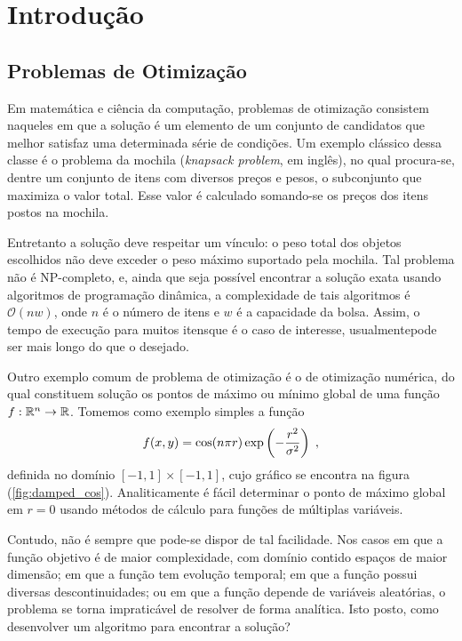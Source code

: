 \chapter{Introdução}\label{cap_introducao}

\section{Problemas de Otimização}

Em matemática e ciência da computação, problemas de otimização consistem naqueles em que
a solução é um elemento de um conjunto de candidatos que melhor satisfaz uma determinada
série de condições. Um exemplo clássico dessa classe é o problema da mochila 
(\textit{knapsack problem}, em inglês)\cite{knapsack_wiki}, no qual
procura-se, dentre um conjunto de itens com diversos preços e pesos, o subconjunto que
maximiza o valor total. Esse valor é calculado somando-se os preços dos itens postos na
mochila. 

Entretanto a solução deve respeitar um vínculo: o peso total dos objetos escolhidos
não deve exceder o peso máximo suportado pela mochila. Tal problema não é NP-completo, e,
ainda que seja possível encontrar a solução exata usando algoritmos de programação dinâmica,
a complexidade de tais algoritmos é $ \mathcal{O} (n w) $, onde $n$ é o número de itens e $w$ é a
capacidade da bolsa. Assim, o tempo de execução para muitos itens\trav que é o caso de interesse,
usualmente\trav pode ser mais longo do que o desejado.

Outro exemplo comum de problema de otimização é o de otimização numérica, do qual constituem
solução os pontos de máximo ou mínimo global de uma função 
$ f : \mathbb{R}^n \rightarrow \mathbb{R} $. Tomemos como exemplo simples a função
\begin{equation}
  f(x, y) = \cos(n\pi r)\exp\left(-\frac{r^2}{\sigma^2}\right) \;\mathrm{,}
  \label{eq:damped_cos}
\end{equation}
definida no domínio $ [-1, 1] \times [-1, 1] $, cujo gráfico se encontra na figura (\ref{fig:damped_cos}). 
Analiticamente é fácil determinar o ponto de máximo global em $ r = 0 $ usando métodos de cálculo
para funções de múltiplas variáveis. 

Contudo, não é sempre que pode-se dispor de tal facilidade. 
Nos casos em que a função objetivo é de maior complexidade, com domínio contido espaços de maior dimensão; 
em que a função tem evolução temporal; em que a função possui diversas descontinuidades; ou em que a função
depende de variáveis aleatórias, o problema se torna impraticável de resolver de forma analítica. 
Isto posto, como desenvolver um algoritmo para encontrar a solução?

